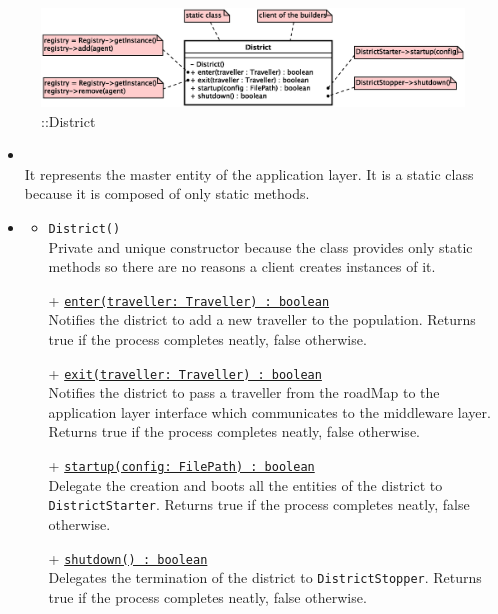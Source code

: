 \begin{figure}[h]
\centering
\includegraphics[scale=0.6,keepaspectratio]{images/solution/app/backend/district.eps}
\caption{\pReactive::District}
\label{fig:sd-app-district}
\end{figure}
\FloatBarrier
\begin{itemize}
  \item \textbf{\descr} \\
  It represents the master entity of the application layer.
  It is a static class because it is composed of only static methods.
  \item \textbf{\ops}
  \begin{itemize}
    \item \texttt{District()} \\
    Private and unique constructor because the class provides only static methods 
    so there are no reasons a client creates instances of it.
    \item[+] \texttt{\underline{enter(traveller: Traveller) : boolean}} \\
    Notifies the district to add a new traveller to the population.
    Returns true if the process completes neatly, false otherwise.
    \item[+] \texttt{\underline{exit(traveller: Traveller) : boolean}} \\
    Notifies the district to pass a traveller from the roadMap to the 
    application layer interface which communicates to the middleware layer.
    Returns true if the process completes neatly, false otherwise.
    \item[+] \texttt{\underline{startup(config: FilePath) : boolean}} \\
    Delegate the creation and boots all the entities of the district
    to \texttt{DistrictStarter}.
    Returns true if the process completes neatly, false otherwise.
    \item[+] \texttt{\underline{shutdown() : boolean}} \\
    Delegates the termination of the district
    to \texttt{DistrictStopper}.
    Returns true if the process completes neatly, false otherwise.
  \end{itemize}
\end{itemize} 
